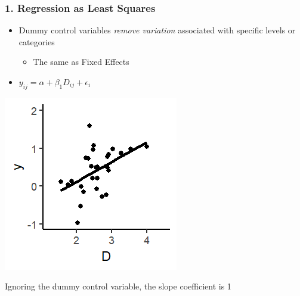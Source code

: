 \documentclass[xcolor=x11names,compress]{beamer}\usepackage[]{graphicx}\usepackage[]{color}
\makeatletter
\def\maxwidth{ %
  \ifdim\Gin@nat@width>\linewidth
    \linewidth
  \else
    \Gin@nat@width
  \fi
}
\newenvironment{knitrout}{}{} %
\renewcommand{\(}{\begin{columns}}
\renewcommand{\)}{\end{columns}}
\newcommand{\<}[1]{\begin{column}{#1}}
\renewcommand{\>}{\end{column}}
\makeatother
\begin{document}
\begin{frame}
\frametitle{1. Regression as Least Squares}
\begin{itemize}
\item Dummy control variables \textit{remove variation} associated with specific levels or categories
\begin{itemize}
\item The same as Fixed Effects
\pause
\end{itemize}
\item $y_{ij} = \alpha + \beta_1 D_{ij} + \epsilon_i$
\end{itemize}
\begin{multicols}{2}
\begin{knitrout}
\color{fgcolor}
\includegraphics[width=\maxwidth]{figure/graph_ols_FE1-1} 

\end{knitrout}
\columnbreak
Ignoring the dummy control variable, the slope coefficient is 1 
\end{multicols}
\end{frame}
\end{document}
